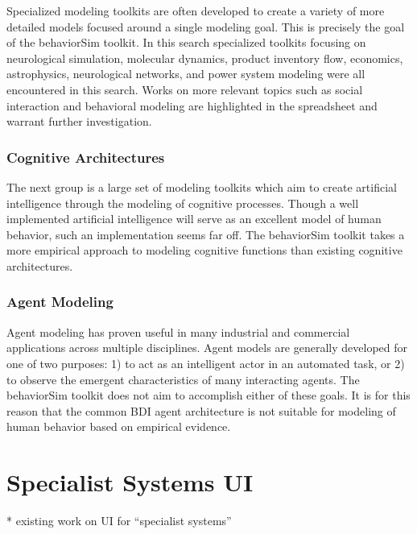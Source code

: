 Specialized modeling toolkits are often developed to create a variety of more detailed models focused around a single modeling goal. 
This is precisely the goal of the behaviorSim toolkit. 
In this search specialized toolkits focusing on neurological simulation, molecular dynamics, product inventory flow, economics, astrophysics, neurological networks, and power system modeling were all encountered in this search. 
Works on more relevant topics such as social interaction and behavioral modeling are highlighted in the spreadsheet and warrant further investigation.

\subsubsection{Cognitive Architectures}
The next group is a large set of modeling toolkits which aim to create artificial intelligence through the modeling of cognitive processes. 
Though a well implemented artificial intelligence will serve as an excellent model of human behavior, such an implementation seems far off. 
The behaviorSim toolkit takes a more empirical approach to modeling cognitive functions than existing cognitive architectures.

\subsubsection{Agent Modeling}
Agent modeling has proven useful in many industrial and commercial applications across multiple disciplines. 
Agent models are generally developed for one of two purposes: 1) to act as an intelligent actor in an automated task, or 2) to observe the emergent characteristics of many interacting agents. 
The behaviorSim toolkit does not aim to accomplish either of these goals. 
It is for this reason that the common BDI agent architecture is not suitable for modeling of human behavior based on empirical evidence. 

\section{Specialist Systems UI}
* existing work on UI for “specialist systems”
